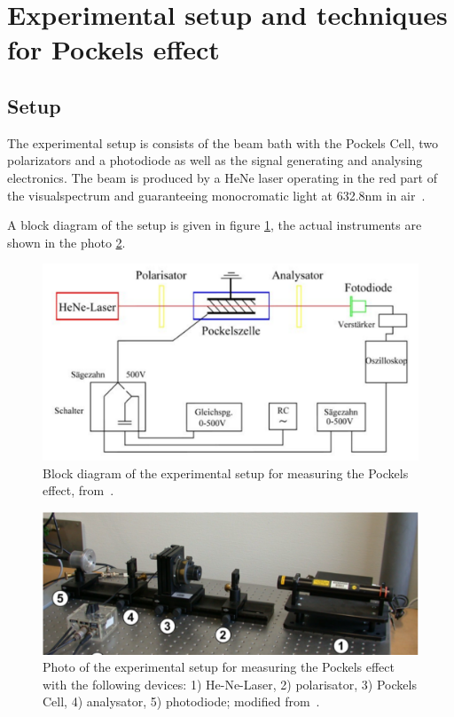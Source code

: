 \section{Experimental setup and techniques for Pockels effect}
\subsection{Setup}
\label{sec:setup_pockels}
The experimental setup is consists of the beam bath with the Pockels Cell, 
two polarizators and a photodiode as well as the signal generating and 
analysing electronics. The beam is produced by a HeNe laser operating in 
the red part of the visualspectrum and guaranteeing monocromatic light 
at 632.8nm in air~\cite{versuchsanleitung}. 

A block diagram of the setup is given in figure \ref{fig:setup_block}, 
the actual instruments are shown in the photo \ref{fig:setup_photo}. 

\begin{figure}
\includegraphics[width=\pltw]{figures/setup_block.pdf}
\caption{
    Block diagram of the experimental setup for measuring the 
    Pockels effect, 
    from~\cite{versuchsanleitung}.
    }
\label{fig:setup_block}
\end{figure}

\begin{figure}
\includegraphics[width=\textwidth]{figures/setup_photo.pdf}
\caption{
    Photo of the experimental setup for measuring the 
    Pockels effect with the following devices:
    1) He-Ne-Laser, 2) polarisator, 3) Pockels Cell, 
    4) analysator, 5) photodiode;
    modified from~\cite{versuchsanleitung}.
    }
\label{fig:setup_photo}
\end{figure}

